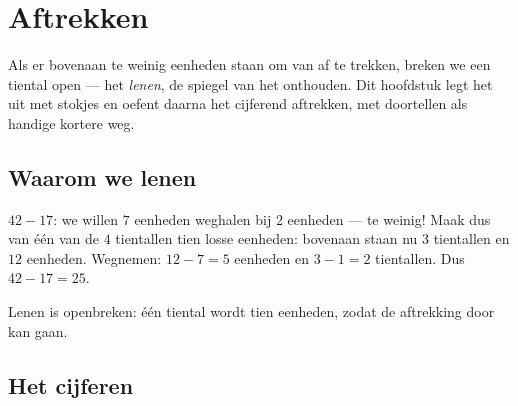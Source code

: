 \chapter{Aftrekken}\label{ch:g2:subtraction}

Als er bovenaan te weinig eenheden staan om van af te trekken, breken
we een tiental open --- het \emph{lenen}, de spiegel van het
onthouden. Dit hoofdstuk legt het uit met stokjes en oefent daarna het
cijferend aftrekken, met doortellen als handige kortere weg.

\section{Waarom we lenen}

\begin{example}\label{ex:g2:subtraction:unbundle}
$42 - 17$: we willen $7$ eenheden weghalen bij $2$ eenheden --- te
weinig! Maak dus van één van de $4$ tientallen tien losse eenheden:
bovenaan staan nu $3$ tientallen en $12$ eenheden. Wegnemen:
$12 - 7 = 5$ eenheden en $3 - 1 = 2$ tientallen. Dus $42 - 17 = 25$.
\end{example}

\begin{omfigure}

{\small Lenen is openbreken: één tiental wordt tien eenheden, zodat de
aftrekking door kan gaan.}
\end{omfigure}

\section{Het cijferen}

